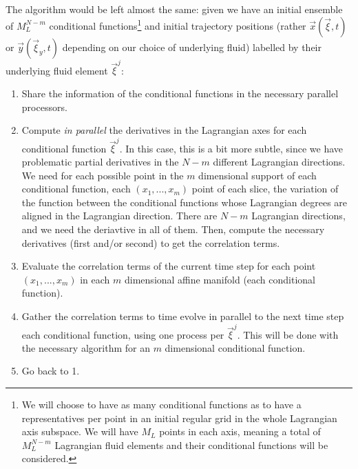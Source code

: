 \documentclass[11pt, a4paper]{article} %
\begin{document}
The algorithm would be left almost the same: given we have an initial ensemble of $M_L^{N-m}$ conditional functions\footnote{We will choose to have as many conditional functions as to have a representatives per point in an initial regular grid in the whole Lagrangian axis subspace. We will have $M_L$ points in each axis, meaning a total of $M_L^{N-m}$ Lagrangian fluid elements and their conditional functions will be considered.} and initial trajectory positions (rather $\vec{x}(\vec{\xi},t)$ or $\vec{y}(\vec{\xi}_y,t)$ depending on our choice of underlying fluid) labelled by their underlying fluid element $\vec{\xi}^j$:
\begin{enumerate}
\item Share the information of the conditional functions in the necessary parallel processors.
\item Compute {\em in parallel} the derivatives in the Lagrangian axes for each conditional function $\vec{\xi}^j$. In this case, this is a bit more subtle, since we have problematic partial derivatives in the $N-m$ different Lagrangian directions. We need for each possible point in the $m$ dimensional support of each conditional function, each $(x_1,...,x_{m})$ point of each slice, the variation of the function between the conditional functions whose Lagrangian degrees are aligned in the Lagrangian direction. There are $N-m$ Lagrangian directions, and we need the deriavtive in all of them. Then, compute the necessary derivatives (first and/or second) to get the correlation terms.
\item Evaluate the correlation terms of the current time step for each point $(x_1,...,x_{m})$ in each $m$ dimensional affine manifold (each conditional function).

\item Gather the correlation terms to time evolve in parallel to the next time step each conditional function, using one process per $\vec{\xi}^j$. This will be done with the necessary algorithm for an $m$ dimensional conditional function.
\item Go back to 1.
\end{enumerate}
\end{document}
